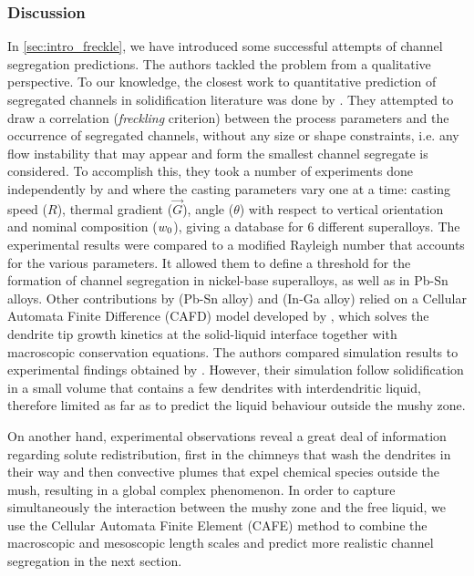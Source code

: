 \subsubsection{Discussion}
In \cref{sec:intro_freckle}, we have introduced some successful attempts of channel segregation predictions. 
The authors tackled the problem from a qualitative perspective. 
To our knowledge, the closest work to quantitative prediction of segregated channels in solidification literature was done by \citet{ramirez_evaluation_2003}.
They attempted to draw a correlation (\emph{freckling} criterion) between the process parameters and the occurrence of segregated channels, 
without any size or shape constraints, i.e. any flow instability that may appear and form the smallest channel segregate is considered. 
To accomplish this, they took a number of experiments done independently by \citet{pollock_breakdown_1996} and \citet{auburtin_freckle_2000} 
where the casting parameters vary one at a time: casting speed ($R$), thermal gradient ($\vec{G}$), angle ($\theta$) with respect to vertical 
orientation and nominal composition (${w}_0$), giving a database for 6 different superalloys. The experimental results were 
compared to a modified Rayleigh number that accounts for the various parameters. It allowed them to define a threshold for the formation
of channel segregation in nickel-base superalloys, as well as in Pb-Sn alloys.
Other contributions by \citet{yuan_new_2012} (Pb-Sn alloy) and  \citet{karagadde_3-d_2014} (In-Ga alloy) relied on a Cellular Automata Finite Difference
(CAFD) model developed by \citet{lee_modeling_2002}, which  solves the dendrite tip growth kinetics at 
the solid-liquid interface together with macroscopic conservation equations. 
The authors compared simulation results to experimental findings obtained by \citet{shevchenko_chimney_2013}.
However, their simulation follow solidification in a small volume that contains a few dendrites with interdendritic liquid, 
therefore limited as far as to predict the liquid behaviour outside the mushy zone.

On another hand, experimental observations reveal a great deal of information 
regarding solute redistribution, first in the chimneys that wash the dendrites in their 
way and then convective plumes that expel chemical species outside the mush, resulting in a global complex phenomenon.
In order to capture simultaneously the interaction between the mushy zone and the free liquid, we use 
the Cellular Automata Finite Element (CAFE) method to combine the macroscopic and mesoscopic length scales
and predict more realistic channel segregation in the next section.


